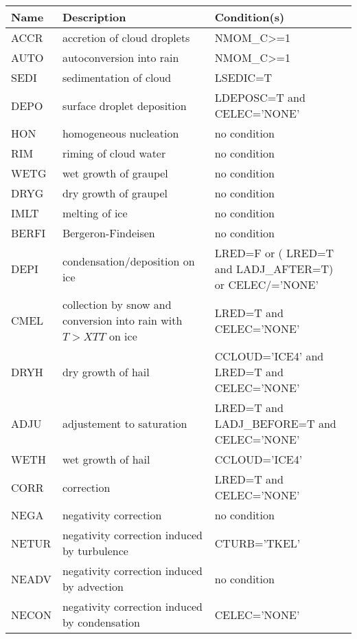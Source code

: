 \begin{longtable} {|p{}|p{}|p{}|}
\hline
Name & Description & Condition(s) \\
\hline \hline
\endhead
ACCR   & accretion of cloud droplets                   & NMOM\_C>=1 \\\hline
AUTO   & autoconversion into rain                      & NMOM\_C>=1 \\\hline
SEDI   & sedimentation of cloud                        & LSEDIC=T \\\hline
DEPO   & surface droplet deposition                    & LDEPOSC=T and CELEC='NONE' \\\hline
HON    & homogeneous nucleation                        & no condition \\\hline
RIM    & riming of cloud water                         & no condition \\\hline
WETG   & wet growth of graupel                         & no condition \\\hline
DRYG   & dry growth of graupel                         & no condition \\\hline
IMLT   & melting of ice                                & no condition \\\hline
BERFI  & Bergeron-Findeisen                            & no condition \\\hline
DEPI   & condensation/deposition on ice                & LRED=F or ( LRED=T and LADJ\_AFTER=T) or CELEC/='NONE' \\\hline
CMEL   & collection by snow and conversion into rain with $T>XTT$ on ice & LRED=T and CELEC='NONE' \\\hline
DRYH   & dry growth of hail                            & CCLOUD='ICE4' and LRED=T and CELEC='NONE' \\\hline
ADJU   & adjustement to saturation                     & LRED=T and LADJ\_BEFORE=T and CELEC='NONE' \\\hline
WETH   & wet growth of hail                            & CCLOUD='ICE4' \\\hline
CORR   & correction                                    & LRED=T and CELEC='NONE' \\\hline
NEGA   & negativity correction                         & no condition \\\hline
NETUR  & negativity correction induced by turbulence   & CTURB='TKEL' \\\hline
NEADV  & negativity correction induced by advection    & no condition \\\hline
NECON  & negativity correction induced by condensation & CELEC='NONE' \\\hline
\end{longtable}

